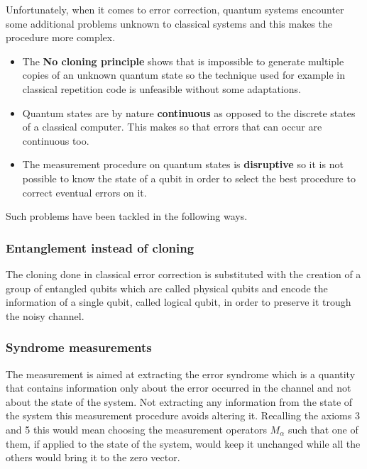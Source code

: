 \documentclass{article}
\begin{document}
Unfortunately, when it comes to error correction, quantum systems encounter
some additional problems unknown to classical systems and this makes the
procedure more complex.
\begin {itemize}

\item The \textbf{No cloning principle} shows that is impossible to generate
multiple copies of an unknown quantum state so the technique used for example
in classical repetition code is unfeasible without some adaptations.

\item Quantum states are by nature \textbf{continuous} as opposed to the
discrete states of a classical computer.
This makes so that errors that can occur are continuous too.

\item The measurement procedure on quantum states is \textbf{disruptive} so it is not
possible to know the state of a qubit in order to select the best procedure
to correct eventual errors on it.
\end{itemize}


Such problems have been tackled in the following ways.

\subsubsection{Entanglement instead of cloning}

The cloning done in classical error correction is substituted with
the creation of a group of entangled qubits which are called physical qubits
and encode the information of a single qubit, called logical qubit,  in order
to preserve it trough the noisy channel.


\subsubsection{Syndrome measurements}

The measurement is aimed at extracting the error syndrome which
is a quantity that contains information only about the error occurred
in the channel and not about the state of the system.
Not extracting any information from the state of the system
this measurement procedure avoids altering it.
Recalling the axioms 3 and 5 this would mean choosing the measurement
operators $M_\alpha$ such that one of them, if applied to the state of
the system, would keep it unchanged while all the others would bring
it to the zero vector.
\end{document}
